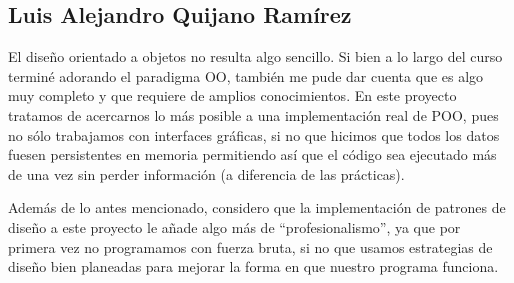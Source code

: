 \documentclass[12pt]{article}
\begin{document}
\subsection{Luis Alejandro Quijano Ramírez}
El diseño orientado a objetos no resulta algo sencillo. Si bien a lo largo del curso terminé adorando el paradigma OO, también me pude dar cuenta que es algo muy completo y que requiere de amplios conocimientos. En este proyecto tratamos de acercarnos lo más posible a una implementación real de POO, pues no sólo trabajamos con interfaces gráficas, si no que hicimos que todos los datos fuesen persistentes en memoria permitiendo así que el código sea ejecutado más de una vez sin perder información (a diferencia de las prácticas).

\par Además de lo antes mencionado, considero que la implementación de patrones de diseño a este proyecto le añade algo más de ``profesionalismo'', ya que por primera vez no programamos con fuerza bruta, si no que usamos estrategias de diseño bien planeadas para mejorar la forma en que nuestro programa funciona.
\end{document}
